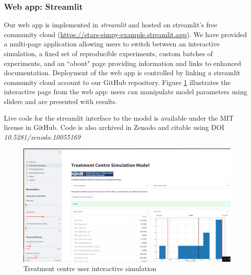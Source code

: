 \documentclass[]{interact}
\theoremstyle{plain}%
\theoremstyle{definition}
\theoremstyle{remark}
\begin{document}

\subsubsection{Web app: Streamlit}

Our web app is implemented in \textit{streamlit} and hosted on streamlit's free community cloud (\url{https://stars-simpy-example.streamlit.app}).  We have provided a multi-page application allowing users to switch between an interactive simulation, a fixed set of reproducible experiments, custom batches of experiments, and an ``about" page providing information and links to enhanced documentation. Deployment of the web app is controlled by linking a streamlit community cloud account to our GitHub repository.  Figure \ref{fig:app} illustrates the interactive page from the web app: users can manipulate model parameters using sliders and are presented with results.

Live code for the streamlit interface to the model is available under the MIT license in GitHub. Code is also archived in Zenodo and citable using DOI \textit{10.5281/zenodo.10055169} \citep{applied_example2_app}




\begin{figure}[ht]
\centering
\includegraphics[scale=0.18]{images/web_app_screenshot.png}
\caption{Treatment centre user interactive simulation  }
\label{fig:app}
\end{figure}
\end{document}
